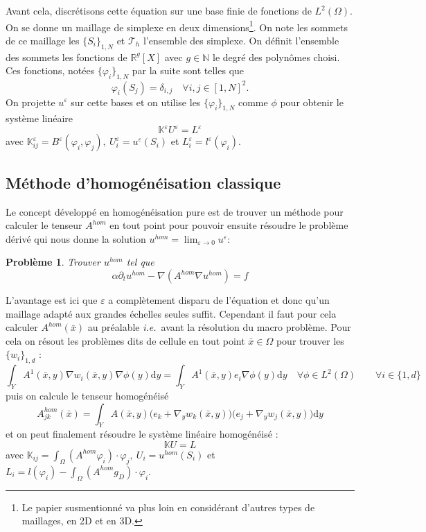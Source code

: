 \documentclass[11pt]{article}
\newtheorem{pb}{Problème}
\newcommand{\N}{\mathbb{N}}
\newcommand{\R}{\mathbb{R}}
\newcommand{\K}{\mathbb{K}}
\newcommand{\T}{\mathcal{T}}
\newcommand{\Ah}{A^{hom}}
\newcommand{\uh}{u^{hom}}
\newcommand{\bx}{\bar{x}}
\newcommand{\Be}{B^\varepsilon}
\newcommand{\ue}{u^\varepsilon}
\newcommand{\ie}{\emph{i.e.{}}~}
\newcommand{\td}{\text{d}}
\begin{document}
Avant cela, discrétisons cette équation sur une base finie de fonctions de $L^2(\Omega)$. On se donne un maillage de simplexe en deux
dimensions\footnote{Le papier susmentionné va plus loin en considérant d'autres types de maillages, en 2D et en 3D.}. On note les sommets de ce maillage
les $\{S_i\}_{1, N}$ et $\T_h$ l'ensemble des simplexe. On définit l'ensemble des sommets les fonctions de $\R^g[X]$ avec $g\in\N$ le degré des polynômes
choisi. Ces fonctions, notées $\{\varphi_i\}_{1, N}$ par la suite sont telles que
\[
  \varphi_i(S_j) = \delta_{i,j} \quad \forall i, j \in [1, N]^2.
\]
On projette $\ue$ sur cette bases et on utilise les $\{\varphi_i\}_{1, N}$ comme $\phi$ pour obtenir le système linéaire 
\[
  \K^\varepsilon U^\varepsilon = L^\varepsilon
\]
avec $\K^\varepsilon_{ij} = \Be(\varphi_i, \varphi_j), ~ U^\varepsilon_i = \ue(S_i)$ et $L^\varepsilon_i = l^\varepsilon(\varphi_i)$.


\subsection{Méthode d'homogénéisation classique}
  
Le concept développé en homogénéisation pure est de trouver un méthode pour calculer le tenseur $\Ah$ en tout point pour pouvoir ensuite résoudre le
problème dérivé qui nous donne la solution $\uh=\lim_{\varepsilon\to 0}\ue$:
\begin{pb}
  Trouver $\uh$ tel que
  \begin{equation*}
    \alpha \partial_t \uh -\nabla(\Ah \nabla \uh) = f
  \end{equation*}
\end{pb}


L'avantage est ici que $\varepsilon$ a complètement disparu de l'équation et donc qu'un
maillage adapté aux grandes échelles seules suffit. Cependant il faut pour cela calculer $\Ah(\bx)$ au préalable \ie avant la résolution du macro
problème. Pour cela on résout les problèmes dits de cellule en tout point $\bx \in \Omega$ pour trouver les $\{w_i\}_{1, d}$ : 
\begin{equation}
  \label{eq:cell}
  \int_Y A^1(\bx, y) \nabla w_i(\bx, y) \nabla \phi(y) \td y  = \int_Y A^1(\bx, y) e_i \nabla \phi(y) \td y
  \quad  \forall\phi\in L^2(\Omega) \qquad \forall i \in \{1, d\} 
\end{equation}
puis on calcule le tenseur homogénéisé
\begin{equation}
  \label{eq:Ahom}
  \Ah_{jk}(\bx) = \int_Y A(\bx, y)\big(e_k+\nabla_y w_k(\bx, y)\big)\big(e_j+\nabla_y w_j(\bx, y)\big) \td y 
\end{equation}
et on peut finalement résoudre le système linéaire homogénéisé :
\[
  \K U = L
\]
avec $\K_{ij} = \int_\Omega (\Ah \varphi_i)\cdot \varphi_j, ~ U_i = \uh(S_i)$ et $L_i = l(\varphi_i) - \int_\Omega (\Ah g_D)\cdot \varphi_i$.
\end{document}
